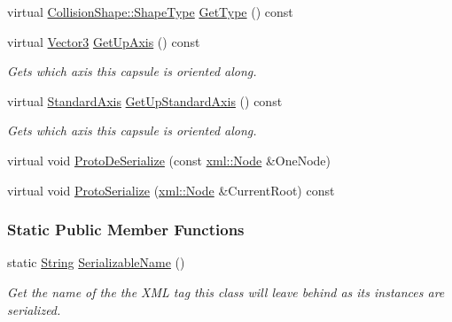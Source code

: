 \begin{DoxyCompactItemize}
virtual \hyperlink{classMezzanine_1_1CollisionShape_ad04186055565998879b64176d6dd100d}{CollisionShape::ShapeType} \hyperlink{classMezzanine_1_1CapsuleCollisionShape_a2773853a924c2a97838546d96d851ba5}{GetType} () const 
\item 
virtual \hyperlink{classMezzanine_1_1Vector3}{Vector3} \hyperlink{classMezzanine_1_1CapsuleCollisionShape_a0e81e4ffde066d7673ea008024823644}{GetUpAxis} () const 
\begin{DoxyCompactList}\small\item\em Gets which axis this capsule is oriented along. \item\end{DoxyCompactList}\item 
virtual \hyperlink{namespaceMezzanine_ab41a00a8c6a47b576dc987ec34e16ba1}{StandardAxis} \hyperlink{classMezzanine_1_1CapsuleCollisionShape_ab00e0b036ef4de6d1c663625d0408a4e}{GetUpStandardAxis} () const 
\begin{DoxyCompactList}\small\item\em Gets which axis this capsule is oriented along. \item\end{DoxyCompactList}\item 
virtual void \hyperlink{classMezzanine_1_1CapsuleCollisionShape_a16ede5d5ed04ae7d146ff28a4484c41d}{ProtoDeSerialize} (const \hyperlink{classMezzanine_1_1xml_1_1Node}{xml::Node} \&OneNode)
\item 
virtual void \hyperlink{classMezzanine_1_1CapsuleCollisionShape_a997e8ab5bc03e7858b51b449e12be26c}{ProtoSerialize} (\hyperlink{classMezzanine_1_1xml_1_1Node}{xml::Node} \&CurrentRoot) const 
\end{DoxyCompactItemize}
\subsubsection*{Static Public Member Functions}
\begin{DoxyCompactItemize}
\item 
static \hyperlink{namespaceMezzanine_acf9fcc130e6ebf08e3d8491aebcf1c86}{String} \hyperlink{classMezzanine_1_1CapsuleCollisionShape_a6225978757c6b80f590336cb04f9ebf5}{SerializableName} ()
\begin{DoxyCompactList}\small\item\em Get the name of the the XML tag this class will leave behind as its instances are serialized. \item\end{DoxyCompactList}\end{DoxyCompactItemize}
